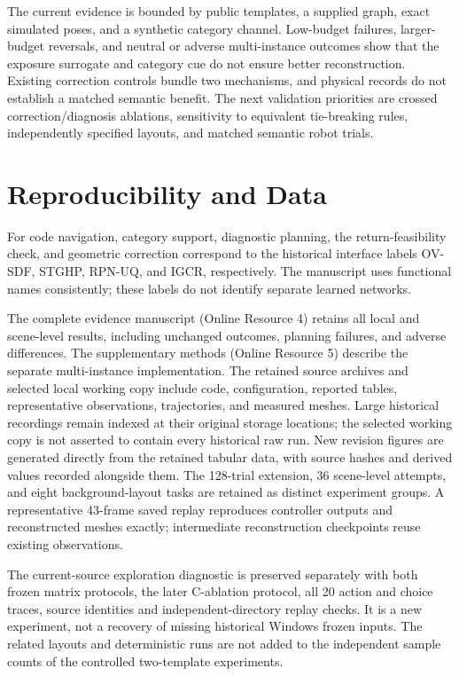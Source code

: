 \documentclass[11pt,a4paper]{article}
\providecommand{\hypertarget}[2]{#2}
\begin{document}
The current evidence is bounded by public templates, a supplied graph, exact simulated poses, and a synthetic category channel. Low-budget failures, larger-budget reversals, and neutral or adverse multi-instance outcomes show that the exposure surrogate and category cue do not ensure better reconstruction. Existing correction controls bundle two mechanisms, and physical records do not establish a matched semantic benefit. The next validation priorities are crossed correction/diagnosis ablations, sensitivity to equivalent tie-breaking rules, independently specified layouts, and matched semantic robot trials.

\hypertarget{reproducibility-and-data}{%
\section{Reproducibility and Data}\label{reproducibility-and-data}}

For code navigation, category support, diagnostic planning, the return-feasibility check, and geometric correction correspond to the historical interface labels OV-SDF, STGHP, RPN-UQ, and IGCR, respectively. The manuscript uses functional names consistently; these labels do not identify separate learned networks.

The complete evidence manuscript (Online Resource 4) retains all local and scene-level results, including unchanged outcomes, planning failures, and adverse differences. The supplementary methods (Online Resource 5) describe the separate multi-instance implementation. The retained source archives and selected local working copy include code, configuration, reported tables, representative observations, trajectories, and measured meshes. Large historical recordings remain indexed at their original storage locations; the selected working copy is not asserted to contain every historical raw run. New revision figures are generated directly from the retained tabular data, with source hashes and derived values recorded alongside them. The 128-trial extension, 36 scene-level attempts, and eight background-layout tasks are retained as distinct experiment groups. A representative 43-frame saved replay reproduces controller outputs and reconstructed meshes exactly; intermediate reconstruction checkpoints reuse existing observations.

The current-source exploration diagnostic is preserved separately with
both frozen matrix protocols, the later C-ablation protocol, all 20
action and choice traces, source identities and independent-directory
replay checks. It is a new experiment, not a recovery of missing
historical Windows frozen inputs. The related layouts and deterministic
runs are not added to the independent sample counts of the controlled
two-template experiments.
\end{document}
